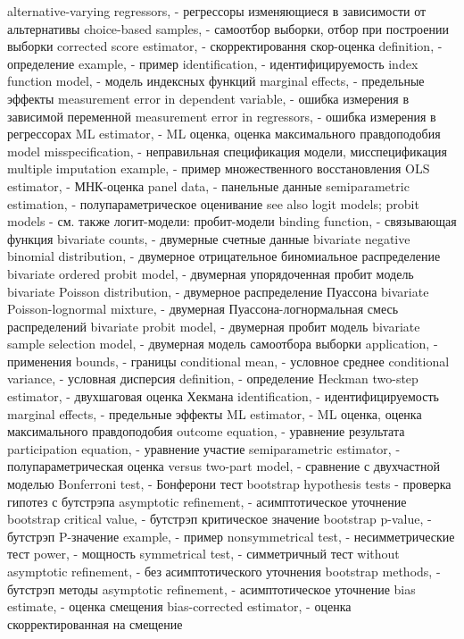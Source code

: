 alternative-varying regressors, - регрессоры изменяющиеся в зависимости от альтернативы
choice-based samples, - самоотбор выборки, отбор при построении выборки
corrected score estimator, - скорректировання скор-оценка
definition, - определение
example, - пример
identification, - идентифицируемость
index function model, - модель индексных функций
marginal effects, - предельные эффекты
measurement error in dependent variable, - ошибка измерения в зависимой переменной
measurement error in regressors, - ошибка измерения в регрессорах
ML estimator, - ML оценка, оценка максимального правдоподобия
model misspecification, - неправильная спецификация модели, мисспецификация
multiple imputation example, - пример множественного восстановления
OLS estimator, - МНК-оценка
panel data, - панельные данные
semiparametric estimation, - полупараметрическое оценивание
see also logit models; probit models - см. также логит-модели: пробит-модели
binding function, - связывающая функция
bivariate counts, - двумерные счетные данные
bivariate negative binomial distribution, - двумерное отрицательное биномиальное распределение 
bivariate ordered probit model, - двумерная упорядоченная пробит модель
bivariate Poisson distribution, - двумерное распределение Пуассона
bivariate Poisson-lognormal mixture, - двумерная Пуассона-логнормальная смесь распределений
bivariate probit model, - двумерная пробит модель
bivariate sample selection model, - двумерная модель самоотбора выборки
application, - применения
bounds, - границы
conditional mean, - условное среднее
conditional variance, - условная дисперсия
definition, - определение
Heckman two-step estimator, - двухшаговая оценка Хекмана 
identification, - идентифицируемость
marginal effects, - предельные эффекты
ML estimator, - ML оценка, оценка максимального правдоподобия
outcome equation, - уравнение результата 
participation equation, - уравнение участие
semiparametric estimator, - полупараметрическая оценка
versus two-part model, - сравнение с двухчастной моделью 
Bonferroni test, - Бонферони тест
bootstrap hypothesis tests - проверка гипотез с бутстрэпа
asymptotic refinement, - асимптотическое уточнение
bootstrap critical value, - бутстрэп критическое значение
bootstrap p-value, - бутстрэп P-значение
example, - пример
nonsymmetrical test, - несимметрические тест
power, - мощность
symmetrical test, - симметричный тест
without asymptotic refinement, - без асимптотического уточнения
bootstrap methods, - бутстрэп методы
asymptotic refinement, - асимптотическое уточнение
bias estimate, - оценка смещения
bias-corrected estimator, - оценка скорректированная на смещение 
